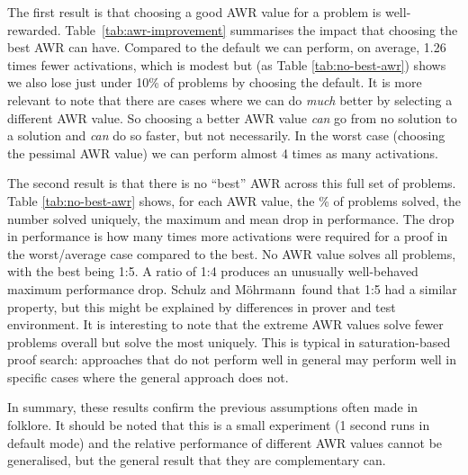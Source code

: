 \documentclass{llncs}
\newcommand{\sandm}{Schulz and M{\"{o}}hrmann}
\begin{document}
The first result is that choosing a good AWR value for a problem is well-rewarded.
Table~\ref{tab:awr-improvement} summarises the impact that choosing the best AWR can have.
Compared to the default we can perform, on average, 1.26 times fewer activations, which is modest but (as Table \ref{tab:no-best-awr}) shows we also lose just under 10\% of problems by choosing the default.
It is more relevant to note that there are cases where we can do \emph{much} better by selecting a different AWR value.
So choosing a better AWR value \emph{can} go from no solution to a solution and \emph{can} do so faster, but not necessarily.
In the worst case (choosing the pessimal AWR value) we can perform almost 4 times as many activations.

The second result is that there is no ``best'' AWR across this full set of problems. Table \ref{tab:no-best-awr} shows, for each AWR value, the \% of problems solved, the number solved uniquely, the maximum and mean drop in performance. The drop in performance is how many times more activations were required for a proof in the worst/average case compared to the best. No AWR value solves all problems, with the best being 1:5. 
A ratio of 1:4 produces an unusually well-behaved maximum performance drop.
\sandm~found that 1:5 had a similar property, but this might be explained by differences in prover and test environment. It is interesting to note that the extreme AWR values solve fewer problems overall but solve the most uniquely. This is typical in saturation-based proof search: approaches that do not perform well in general may perform well in specific cases where the general approach does not.

In summary, these results confirm the previous assumptions often made in folklore. It should be noted that this is a small experiment (1 second runs in default mode) and the relative performance of different AWR values cannot be generalised, but the general result that they are complementary can.
\end{document}
